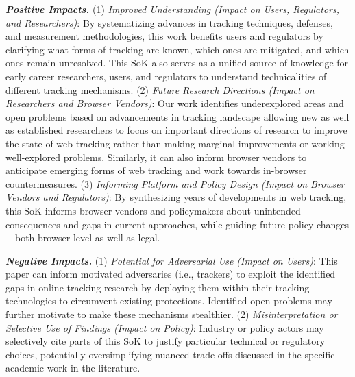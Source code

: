 \noindent \textbf{\textit{Positive Impacts.}}
%
(1) \textit{Improved Understanding (Impact on Users, Regulators, and Researchers)}:
%
By systematizing advances in tracking techniques, defenses, and measurement methodologies, this work benefits users and regulators by clarifying what forms of tracking are known, which ones are mitigated, and which ones remain unresolved.
%
This SoK also serves as a unified source of knowledge for early career researchers, users, and regulators to understand technicalities of different tracking mechanisms.
%
(2) \textit{Future Research Directions (Impact on Researchers and Browser Vendors)}:
%
Our work identifies underexplored areas and open problems based on advancements in tracking landscape allowing new as well as established researchers to focus on important directions of research to improve the state of web tracking rather than making marginal improvements or working well-explored problems.
%
Similarly, it can also inform browser vendors to anticipate emerging forms of web tracking and work towards in-browser countermeasures.
%
(3) \textit{Informing Platform and Policy Design (Impact on Browser Vendors and Regulators)}:
%
By synthesizing years of developments in web tracking, this SoK informs browser vendors and policymakers about unintended consequences and gaps in current approaches, while guiding future policy changes---both browser-level as well as legal.

\noindent \textbf{\textit{Negative Impacts.}}
%
(1) \textit{Potential for Adversarial Use (Impact on Users)}:
%
This paper can inform motivated adversaries (i.e., trackers) to exploit the identified gaps in online tracking research by deploying them within their tracking technologies to circumvent existing protections.
%
Identified open problems may further motivate to make these mechanisms stealthier.
%
(2) \textit{Misinterpretation or Selective Use of Findings (Impact on Policy)}:
%
Industry or policy actors may selectively cite parts of this SoK to justify particular technical or regulatory choices, potentially oversimplifying nuanced trade-offs discussed in the specific academic work in the literature.\\


